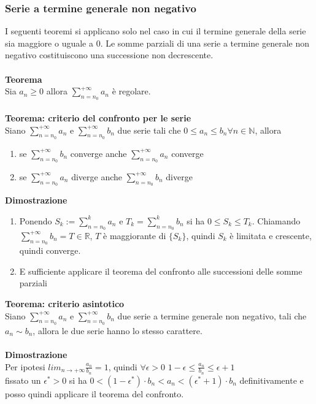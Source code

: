 \documentclass{article}
\begin{document}
\subsubsection{Serie a termine generale non negativo}
I seguenti teoremi si applicano solo nel caso in cui il termine generale della serie sia maggiore o uguale a 0. Le somme parziali di una serie a termine generale non negativo costituiscono una successione non decrescente.\\\\
\textbf{Teorema}\\
Sia $a_n\geq0$ allora $\sum_{n=n_0}^{+\infty}a_n$ è regolare.\\\\
\textbf{Teorema: criterio del confronto per le serie}\\
Siano $\sum_{n=n_0}^{+\infty}a_n$ e $\sum_{n=n_0}^{+\infty}b_n$ due serie tali che $0\leq a_n\leq b_n \forall n\in\mathds{N}$, allora \begin{enumerate}
    \item se $\sum_{n=n_0}^{+\infty}b_n$ converge anche $\sum_{n=n_0}^{+\infty}a_n$ converge
    \item se $\sum_{n=n_0}^{+\infty}a_n$ diverge anche $\sum_{n=n_0}^{+\infty}b_n$ diverge
\end{enumerate}
\textbf{Dimostrazione}
\begin{enumerate}
    \item Ponendo $S_k:=\sum_{n=n_0}^{k}a_n$ e $T_k=\sum_{n=n_0}^{k}b_n$ si ha $0\leq S_k\leq T_k$. Chiamando $\sum_{n=n_0}^{+\infty}b_n=T\in\mathds{R}$, $T$ è maggiorante di $\{S_k\}$, quindi $S_k$ è limitata e crescente, quindi converge.
    \item E sufficiente applicare il teorema del confronto alle successioni delle somme parziali
\end{enumerate}
\textbf{Teorema: criterio asintotico}\\
Siano $\sum_{n=n_0}^{+\infty}a_n$ e $\sum_{n=n_0}^{+\infty}b_n$ due serie a termine generale non negativo, tali che $a_n\sim b_n$, allora le due serie hanno lo stesso carattere.\\\\
\textbf{Dimostrazione}\\
Per ipotesi $lim_{n\rightarrow+\infty}\frac{a_n}{b_n}=1$, quindi $\forall\epsilon>0$ $1-\epsilon\leq\frac{a_n}{b_n}\leq\epsilon+1$\\
fissato un $\epsilon^*>0$ si ha $0<(1-\epsilon^*)\cdot b_n<a_n<(\epsilon^*+1)\cdot b_n$ definitivamente e posso quindi applicare il teorema del confronto.\\
\end{document}
